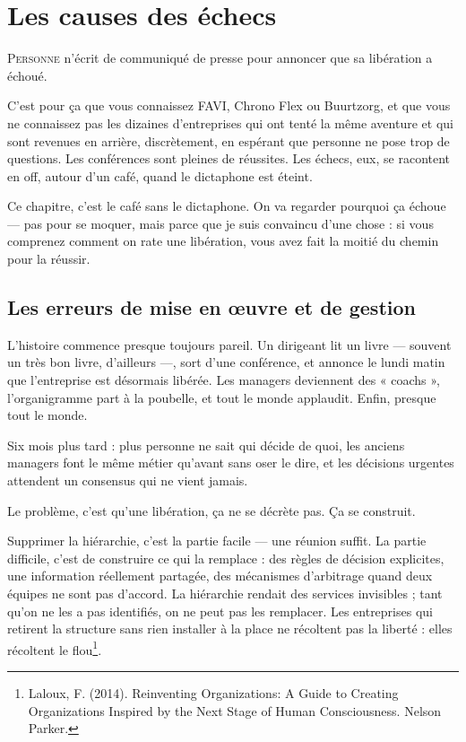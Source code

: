 
\chapter{Les causes des échecs}

\lettrine[lines=2]{P}{ersonne} n'écrit de communiqué de presse pour annoncer que sa libération a échoué.

C'est pour ça que vous connaissez FAVI, Chrono Flex ou Buurtzorg, et que vous ne connaissez pas les dizaines d'entreprises qui ont tenté la même aventure et qui sont revenues en arrière, discrètement, en espérant que personne ne pose trop de questions. Les conférences sont pleines de réussites. Les échecs, eux, se racontent en off, autour d'un café, quand le dictaphone est éteint.

Ce chapitre, c'est le café sans le dictaphone. On va regarder pourquoi ça échoue — pas pour se moquer, mais parce que je suis convaincu d'une chose : si vous comprenez comment on rate une libération, vous avez fait la moitié du chemin pour la réussir.

\section{Les erreurs de mise en œuvre et de gestion}

L'histoire commence presque toujours pareil. Un dirigeant lit un livre — souvent un très bon livre, d'ailleurs —, sort d'une conférence, et annonce le lundi matin que l'entreprise est désormais libérée. Les managers deviennent des « coachs », l'organigramme part à la poubelle, et tout le monde applaudit. Enfin, presque tout le monde.

Six mois plus tard : plus personne ne sait qui décide de quoi, les anciens managers font le même métier qu'avant sans oser le dire, et les décisions urgentes attendent un consensus qui ne vient jamais.

Le problème, c'est qu'une libération, ça ne se décrète pas. Ça se construit.

Supprimer la hiérarchie, c'est la partie facile — une réunion suffit. La partie difficile, c'est de construire ce qui la remplace : des règles de décision explicites, une information réellement partagée, des mécanismes d'arbitrage quand deux équipes ne sont pas d'accord. La hiérarchie rendait des services invisibles ; tant qu'on ne les a pas identifiés, on ne peut pas les remplacer. Les entreprises qui retirent la structure sans rien installer à la place ne récoltent pas la liberté : elles récoltent le flou\footnote{Laloux, F. (2014). Reinventing Organizations: A Guide to Creating Organizations Inspired by the Next Stage of Human Consciousness. Nelson Parker.}.

